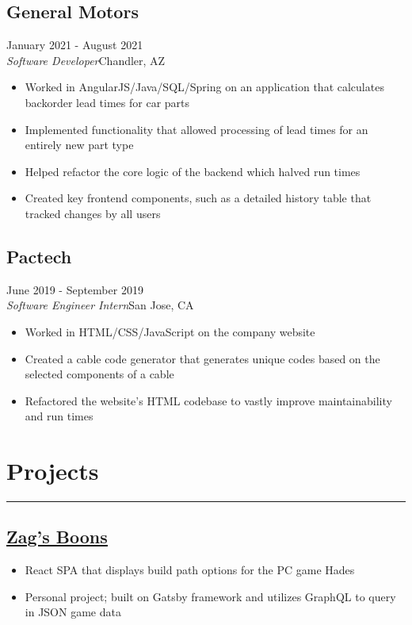 \documentclass{article}
\begin{document}
\vspace{-0.5em}
\subsection{General Motors}\hfill {\color{NavyBlue}January 2021 - August 2021\\ {\color{Black}\it Software Developer}\hfill Chandler, AZ}%
\begin{itemize}
\itemsep0em 
	\item Worked in AngularJS/Java/SQL/Spring on an application that calculates backorder lead times for car parts
	\item Implemented functionality that allowed processing of lead times for an entirely new part type
	\item Helped refactor the core logic of the backend which halved run times
	\item Created key frontend components, such as a detailed history table that tracked changes by all users
\end{itemize}

\vspace{-1em} 
\subsection{Pactech}\hfill {\color{NavyBlue}June 2019 - September 2019\\ {\color{Black}\it Software Engineer Intern}\hfill San Jose, CA}%
\begin{itemize}
	\itemsep0em
	\item Worked in HTML/CSS/JavaScript on the company website
	\item Created a cable code generator that generates unique codes based on the selected components of a cable
	\item Refactored the website's HTML codebase to vastly improve maintainability and run times
\end{itemize}

\vspace{-1em}
\section{Projects}
\vspace{-1.5em}
\par\noindent\rule{\textwidth}{0.4pt}

\vspace{-0.5em}
\subsection{\href{https://zagsboons.netlify.app/}{\color{NavyBlue}\underline{Zag's Boons}}}
\begin{itemize}
	\itemsep0em
	\item React SPA that displays build path options for the PC game Hades
	\item Personal project; built on Gatsby framework and utilizes GraphQL to query in JSON game data
\end{itemize}
\end{document}
